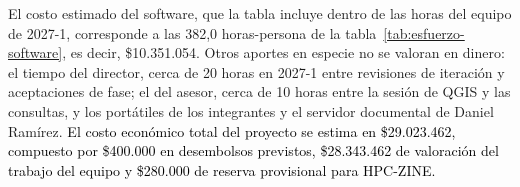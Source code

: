 El costo estimado del software, que la tabla incluye dentro de las horas del equipo de 2027-1, corresponde a las 382,0 horas-persona de la tabla~\ref{tab:esfuerzo-software}, es decir, \$10.351.054. Otros aportes en especie no se valoran en dinero: el tiempo del director, cerca de 20 horas en 2027-1 entre revisiones de iteración y aceptaciones de fase; el del asesor, cerca de 10 horas entre la sesión de QGIS y las consultas, y los portátiles de los integrantes y el servidor documental de Daniel Ramírez. \textcolor{black}{El costo económico total del proyecto se estima en \$29.023.462, compuesto por \$400.000 en desembolsos previstos, \$28.343.462 de valoración del trabajo del equipo y \$280.000 de reserva provisional para HPC-ZINE.}
